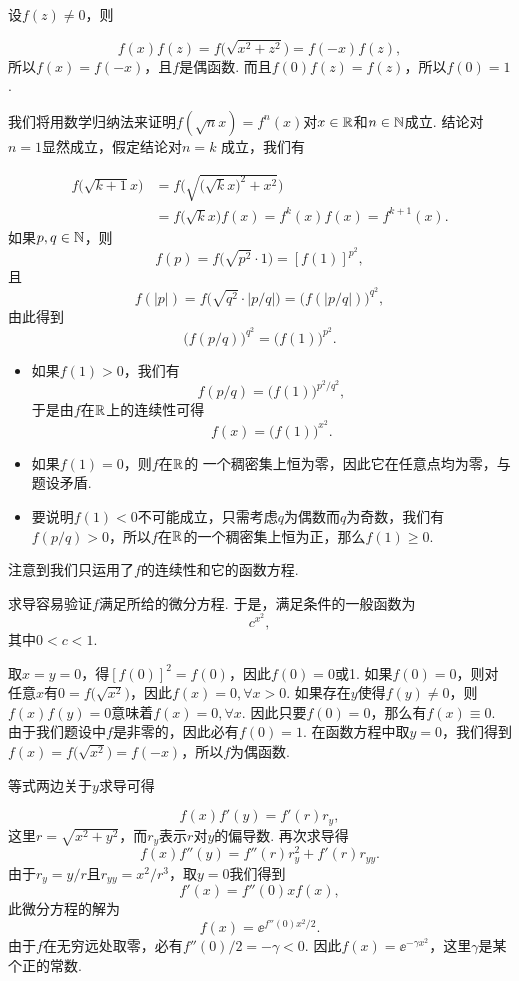 \begin{ans}
  \method \begin{enumb}
    \item 设$f(z)\ne0$，则
  \end{enumb}
  \[ f(x)f(z)=f\Big( \sqrt{x^2+z^2} \Big)
  =f(-x)f(z), \]
  所以$f(x)=f(-x)$，且$f$是偶函数. 而且$f(0)f(z)=f(z)$，所以$f(0)=1$.
  \begin{enumb}\setcounter{enumi}{1}
    \item 我们将用数学归纳法来证明$f(\sqrt nx)=f^n(x)$对$x\in\mathbb R$和$n\in\mathbb N$成立. 结论对$n=1$显然成立，假定结论对$n=k$ 成立，我们有
  \end{enumb}
        \begin{align*}
          f\Big(\sqrt{k+1}x\Big) & =
          f\bigg( \sqrt{\Big(\sqrt kx\Big)^2+x^2 }\bigg)\\
          & = f\Big(\sqrt kx\Big) f(x)=f^k(x)f(x)=f^{k+1}(x).
        \end{align*}
        如果$p,q\in\mathbb N$，则
        \[ f(p)=f\Big(\sqrt{p^2}\cdot 1\Big)=[f(1)]^{p^2}, \]
        且
        \[ f(|p|) = f\Big( \sqrt{q^2}\cdot|p/q| \Big)
        =\big( f(|p/q|) \big)^{q^2}, \]
        由此得到
        \[ \big( f(p/q) \big)^{q^2}= \big(f(1)\big)^{p^2}. \]
        \begin{itemize}
          \item 如果$f(1)>0$，我们有
            \[ f(p/q)=\big(f(1)\big)^{p^2/q^2}, \]
            于是由$f$在$\mathbb R$上的连续性可得
            \[ f(x)=\big(f(1)\big)^{x^2}. \]
          \item 如果$f(1)=0$，则$f$在$\mathbb R$的 一个稠密集上恒为零，因此它在任意点均为零，与题设矛盾.
          \item 要说明$f(1)<0$不可能成立，只需考虑$q$为偶数而$q$为奇数，我们有$f(p/q)>0$，所以$f$在$\mathbb R$的一个稠密集上恒为正，那么$f(1)\ge0$.
        \end{itemize}

    注意到我们只运用了$f$的连续性和它的函数方程.

    求导容易验证$f$满足所给的微分方程. 于是，满足条件的一般函数为
    \[ c^{x^2}, \]
    其中$0<c<1$.

  \method \begin{enumb}
    \item 取$x=y=0$，得$[f(0)]^2=f(0)$，因此$f(0)=0$或1. 如果$f(0)=0$，则对任意$x$有$0=f\big(\sqrt{x^2}\big)$，因此$f(x)=0,\forall x>0$. 如果存在$y$使得$f(y)\ne 0$，则$f(x)f(y)=0$意味着$f(x)=0,\forall x$. 因此只要$f(0)=0$，那么有$f(x)\equiv0$. 由于我们题设中$f$是非零的，因此必有$f(0)=1$. 在函数方程中取$y=0$，我们得到$f(x)=
        f\big(\sqrt{x^2}\big)=f(-x)$，所以$f$为偶函数.
    \item 等式两边关于$y$求导可得
    \end{enumb}
      \[ f(x)f'(y)=f'(r)r_y, \]
      这里$r=\sqrt{x^2+y^2}$，而$r_y$表示$r$对$y$的偏导数. 再次求导得
      \[ f(x)f''(y) = f''(r)r_y^2 + f'(r)r_{yy}. \]
      由于$r_y=y/r$且$r_{yy}=x^2/r^3$，取$y=0$我们得到
      \[ f'(x)=f''(0)xf(x), \]
      此微分方程的解为
      \[ f(x)=\ee^{f''(0)x^2/2}. \]
      由于$f$在无穷远处取零，必有$f''(0)/2=-\gamma<0$. 因此$f(x)=\ee^{-\gamma x^2}$，这里$\gamma$是某个正的常数.
\end{ans}

